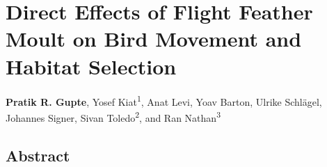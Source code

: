 \chapter{Direct Effects of Flight Feather Moult on Bird Movement and Habitat Selection}\label{ch:holeybirds}

{\noindent \textbf{Pratik R. Gupte}, Yosef Kiat\textsuperscript{1}, Anat Levi, Yoav Barton, Ulrike Schl{\"a}gel, Johannes Signer, Sivan Toledo\textsuperscript{2}, and Ran Nathan\textsuperscript{3}}


\section*{Abstract}


